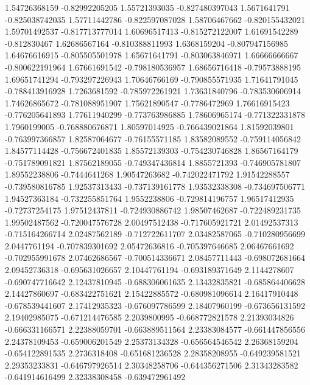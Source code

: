   1.54726368159   -0.82992205205
  1.55721393035  -0.827480397043
   1.5671641791  -0.825038742035
  1.57711442786  -0.822597087028
  1.58706467662  -0.820155432021
  1.59701492537  -0.817713777014
  1.60696517413  -0.815272122007
  1.61691542289     -0.812830467
  1.62686567164  -0.810388811993
   1.6368159204  -0.807947156985
  1.64676616915  -0.805505501978
  1.65671641791  -0.803063846971
  1.66666666667  -0.800622191964
  1.67661691542  -0.798180536957
  1.68656716418   -0.79573888195
  1.69651741294  -0.793297226943
  1.70646766169  -0.790855571935
  1.71641791045  -0.788413916928
   1.7263681592  -0.785972261921
  1.73631840796  -0.783530606914
  1.74626865672  -0.781088951907
  1.75621890547    -0.7786472969
  1.76616915423  -0.776205641893
  1.77611940299  -0.773763986885
  1.78606965174  -0.771322331878
   1.7960199005  -0.768880676871
  1.80597014925  -0.766439021864
  1.81592039801  -0.763997366857
  1.82587064677   -0.76155571185
  1.83582089552  -0.759114056842
  1.84577114428  -0.756672401835
  1.85572139303  -0.754230746828
  1.86567164179  -0.751789091821
  1.87562189055  -0.749347436814
   1.8855721393  -0.746905781807
  1.89552238806    -0.7444641268
  1.90547263682  -0.742022471792
  1.91542288557  -0.739580816785
  1.92537313433  -0.737139161778
  1.93532338308  -0.734697506771
  1.94527363184  -0.732255851764
   1.9552238806  -0.729814196757
  1.96517412935   -0.72737254175
  1.97512437811  -0.724930886742
  1.98507462687  -0.722489231735
  1.99502487562  -0.720047576728
  2.00497512438  -0.717605921721
  2.01492537313  -0.715164266714
  2.02487562189  -0.712722611707
  2.03482587065  -0.710280956699
   2.0447761194  -0.707839301692
  2.05472636816  -0.705397646685
  2.06467661692  -0.702955991678
  2.07462686567  -0.700514336671
  2.08457711443  -0.698072681664
  2.09452736318  -0.695631026657
  2.10447761194  -0.693189371649
   2.1144278607  -0.690747716642
  2.12437810945  -0.688306061635
  2.13432835821  -0.685864406628
  2.14427860697  -0.683422751621
  2.15422885572  -0.680981096614
  2.16417910448  -0.678539441607
  2.17412935323  -0.676097786599
  2.18407960199  -0.673656131592
  2.19402985075  -0.671214476585
   2.2039800995  -0.668772821578
  2.21393034826  -0.666331166571
  2.22388059701  -0.663889511564
  2.23383084577  -0.661447856556
  2.24378109453  -0.659006201549
  2.25373134328  -0.656564546542
  2.26368159204  -0.654122891535
   2.2736318408  -0.651681236528
  2.28358208955  -0.649239581521
  2.29353233831  -0.646797926514
  2.30348258706  -0.644356271506
  2.31343283582  -0.641914616499
  2.32338308458  -0.639472961492
